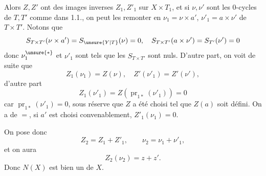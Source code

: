 Alors $Z,Z'$ ont des images inverses $Z_1,Z'_1$ sur $X\times T_1$, et si $\nu,\nu'$ sont les $0$-cycles de $T,T'$ comme dans 1.1., on peut les remonter en $\nu_1=\nu\times a'$, $\nu'_1=a\times\nu'$ de $T\times T'$. Notons que
\[
S_{T\times T'}(\nu\times a')=S_{\unsure{Y|T}}(\nu)=0,\quad S_{T\times T'}(a\times\nu')=S_{T'}(\nu')=0
\]
donc $\nu_1^{\unsure{*}}$ et $\nu'_1$ sont   tels que les $S_{T\times T'}$ sont nuls. D'autre part, on voit de suite que
\[
Z_1(\nu_1)=Z(\nu),\quad Z'(\nu'_1)=Z'(\nu'),
\]
 d'autre part
\[
Z_1(\nu'_1)=Z(\operatorname{pr}_{1*}(\nu'_1))=0
\]
car $\operatorname{pr}_{1*}(\nu'_1)=0$, sous réserve que $Z$ a été choisi tel que $Z(a)$ soit défini. On a de $=$, si $a'$ est choisi convenablement, $Z'_1(\nu_1)=0$.

On pose donc
\[
Z_2=Z_1+Z'_1,\qquad\nu_2=\nu_1+\nu'_1,
\]
et on aura
\[
Z_2(\nu_2)=z+z'.
\]
 Donc $N(X)$ est bien un  de $X$.


